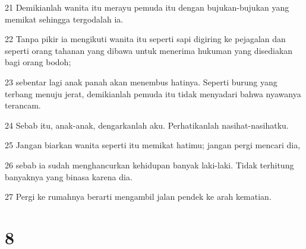\par 21 Demikianlah wanita itu merayu pemuda itu dengan bujukan-bujukan yang memikat sehingga tergodalah ia.
\par 22 Tanpa pikir ia mengikuti wanita itu seperti sapi digiring ke pejagalan dan seperti orang tahanan yang dibawa untuk menerima hukuman yang disediakan bagi orang bodoh;
\par 23 sebentar lagi anak panah akan menembus hatinya. Seperti burung yang terbang menuju jerat, demikianlah pemuda itu tidak menyadari bahwa nyawanya terancam.
\par 24 Sebab itu, anak-anak, dengarkanlah aku. Perhatikanlah nasihat-nasihatku.
\par 25 Jangan biarkan wanita seperti itu memikat hatimu; jangan pergi mencari dia,
\par 26 sebab ia sudah menghancurkan kehidupan banyak laki-laki. Tidak terhitung banyaknya yang binasa karena dia.
\par 27 Pergi ke rumahnya berarti mengambil jalan pendek ke arah kematian.

\chapter{8}

